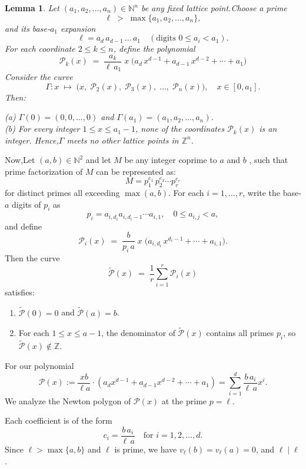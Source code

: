 \documentclass[12pt, reqno]{amsart}
\newtheorem{lemma}[theorem]{Lemma}
\theoremstyle{definition}
\theoremstyle{remark}
\numberwithin{equation}{section}
\begin{document}
\begin{lemma}

Let $(a_1,a_2,\dots,a_n)\in\mathbb{N}^n$ be any fixed lattice point.Choose a prime
\[
  \ell \;>\;\max\{a_1,a_2,\dots,a_n\},
\]
and its base‑$a_1$ expansion
\[
  \ell = a_d\,a_{d-1}\,\dots\,a_1
  \quad(\text{digits }0\le a_i < a_1).
\]
For each coordinate $2\le k\le n$,
define the polynomial
\[
  \mathcal P_k(x)
  \;=\;
  \frac{a_k}{\ell\,a_1}\;x\;\bigl(a_d\,x^{d-1}+a_{d-1}\,x^{d-2}+\cdots+a_1\bigr)
\]
Consider the curve
\[
  \Gamma: x \;\longmapsto\;
  \bigl(x,\;\mathcal P_2(x),\;\mathcal P_3(x),\;\dots,\;\mathcal P_n(x)\bigr),
  \quad x\in[0,a_1].
\]
Then:

(a) $\Gamma(0) = (0,0,\dots,0)$ and $\Gamma(a_1)=(a_1,a_2,\dots,a_n)$.\\

(b) For every integer $1\le x\le a_1-1$, none of the coordinates $\mathcal P_k(x)$ is an integer. Hence,$\Gamma$ meets no other lattice points in $\mathbb{Z}^n$.\\

\end{lemma}
Now,Let $(a,b)\in\mathbb N^2$ and let $M$ be any integer coprime to $a$ and $b$ , such that prime factorization of $M$ can be represented as:  
\[
   M = p_1^{e_1}\,p_2^{e_2}\cdots p_r^{e_r}
\]
for distinct primes all exceeding $\max(a,b)$.  For each $i=1,\dots,r$, write the base‑$a$ digits of $p_i$ as
\[
   p_i = a_{i,d_i}a_{i,d_i-1}\cdots a_{i,1},
   \quad 0\le a_{i,j}<a,
\]
and define
\[
  \mathcal P_{i}(x)
  \;=\;
  \frac{b}{p_i\,a}\;x\;\bigl(a_{i,d_i}\,x^{d_i-1}+\cdots+a_{i,1}\bigr).
\]
Then the  curve
\[
  \widetilde{\mathcal P}(x)
  \;=\;
  \frac{1}{r}\sum_{i=1}^r\mathcal P_{i}(x)
\]
satisfies:
\begin{enumerate}
  \item $\widetilde{\mathcal P}(0)=0$ and $\widetilde{\mathcal P}(a)=b$.
  \item For each $1\le x\le a-1$, the denominator of $\widetilde{\mathcal P}(x)$ contains all primes $p_i$, so $\widetilde{\mathcal P}(x)\notin\mathbb Z$.\\
\end{enumerate}

For our  polynomial
\[
\mathcal{P}(x) := \frac{xb}{\ell a} \cdot (a_{d}x^{d-1}+a_{d-1}x^{d-2}+\cdots+a_{1}) = \sum_{i=1}^{d} \frac{b\,a_i}{\ell\,a} x^i.
\]
We analyze the Newton polygon of $\mathcal{P}(x)$ at the prime $p = \ell$.

Each coefficient is of the form
\[
c_i = \frac{b\,a_i}{\ell\,a} \quad \text{for } i = 1, 2, \dots, d.
\]
Since $\ell > \max\{a, b\}$ and $\ell$ is prime, we have $v_\ell(b) = v_\ell(a) = 0$, and $\ell \mid \ell$.
\end{document}
